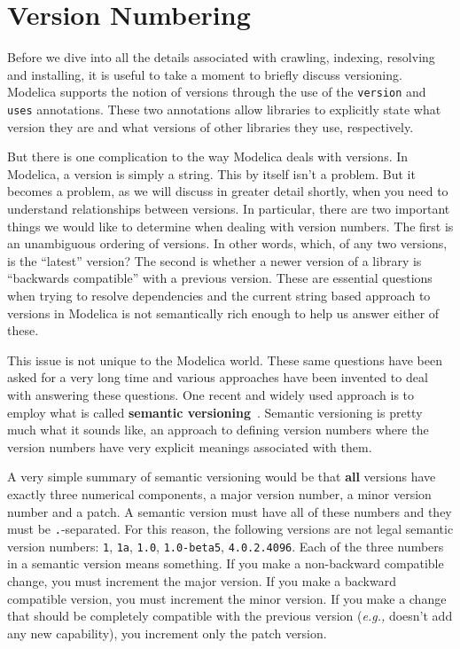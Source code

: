 \documentclass[11pt,a4paper,twocolumn]{article}
\newcommand{\code}[1]{\texttt{#1}} %
\begin{document}
\section{Version Numbering}
\label{sec:numbers}

Before we dive into all the details associated with crawling,
indexing, resolving and installing, it is useful to take a moment to
briefly discuss versioning.  Modelica supports the notion of versions
through the use of the \texttt{version} and \texttt{uses} annotations.  These two
annotations allow libraries to explicitly state what version they are
and what versions of other libraries they use, respectively.

But there is one complication to the way Modelica deals with versions.
In Modelica, a version is simply a string.  This by itself isn't a
problem.  But it becomes a problem, as we will discuss in greater
detail shortly, when you need to understand relationships between
versions.  In particular, there are two important things we would like
to determine when dealing with version numbers.  The first is an
unambiguous ordering of versions.  In other words, which, of any two
versions, is the ``latest'' version?  The second is whether a newer
version of a library is ``backwards compatible'' with a previous
version.  These are essential questions when trying to resolve
dependencies and the current string based approach to versions in
Modelica is not semantically rich enough to help us answer either of
these.

This issue is not unique to the Modelica world.  These same questions
have been asked for a very long time and various approaches have been
invented to deal with answering these questions.  One recent and
widely used approach is to employ what is called \textbf{semantic
  versioning}~\parencite{semver}.  Semantic versioning is pretty much what
it sounds like, an approach to defining version numbers where the
version numbers have very explicit meanings associated with them.

A very simple summary of semantic versioning would be that
\textbf{all} versions have exactly three numerical components, a major
version number, a minor version number and a patch.  A semantic
version must have all of these numbers and they must be
\texttt{.}-separated.  For this reason, the following versions are not
legal semantic version numbers: \code{1}, \code{1a}, \code{1.0},
\code{1.0-beta5}, \code{4.0.2.4096}.  Each of the three numbers in a
semantic version means something.  If you make a non-backward
compatible change, you must increment the major version.  If you make
a backward compatible version, you must increment the minor version.
If you make a change that should be completely compatible with the
previous version ({\it e.g.,} doesn't add any new capability), you
increment only the patch version.
\end{document}
